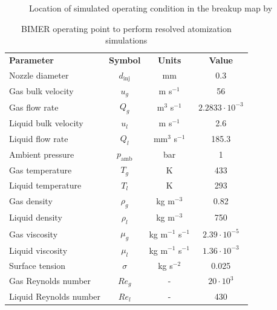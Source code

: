 \begin{figure}[ht]
     \centering
     \vspace*{-0.1in}
     \caption{Location of simulated operating condition in the breakup map by \citeColor[wu_breakup_1997]}
      \label{fig:location_BIMER_op_in_breakup_map}
\end{figure}

\clearpage

\begin{table}[!h]
\centering
\caption{BIMER operating point to perform resolved atomization simulations}
\begin{tabular}{lccc}
\thickhline
\textbf{Parameter} & \textbf{Symbol} & \textbf{Units} &  \textbf{Value} \\
\thickhline
Nozzle diameter & $d_\mathrm{inj}$ & mm & 0.3 \\
Gas bulk velocity & $u_g$ & m s$^{-1}$ & 56 \\
Gas flow rate & $Q_g$ & m$^3$ s$^{-1}$ & $2.2833 \cdot 10^{-3}$   \\
Liquid bulk velocity & $u_l$ & m s$^{-1}$ & 2.6  \\
Liquid flow rate & $Q_l$ & mm$^3$ s$^{-1}$ & 185.3  \\
Ambient pressure & $p_\mathrm{amb}$ & bar &  1 \\
Gas temperature & $T_g$ & K & 433 \\
Liquid temperature & $T_l$ & K & 293 \\
Gas density & $\rho_g$ & kg m$^{-3}$ & 0.82 \\
Liquid density & $\rho_l$ & kg m$^{-3}$ & 750 \\
Gas viscosity & $\mu_g$ & kg m$^{-1}$ s$^{-1}$ & $2.39 \cdot 10^{-5}$ \\
Liquid viscosity & $\mu_l$ & kg m$^{-1}$ s$^{-1}$ &  $1.36 \cdot 10^{-3}$ \\
Surface tension & $\sigma$ & kg s$^{-2}$ &  0.025  \\
\thickhline
Gas Reynolds number & $Re_g$ & - & $20 \cdot 10^3$ \\ %
Liquid Reynolds number & $Re_l$ & - & 430 \\

\end{tabular}
\end{table}
